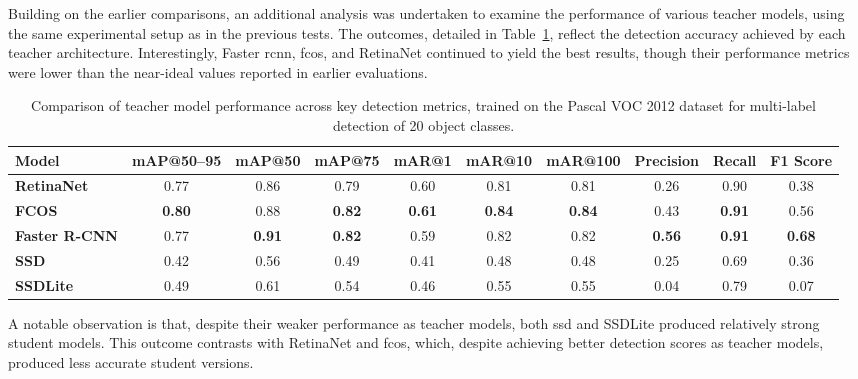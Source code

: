 Building on the earlier comparisons, an additional analysis was undertaken to examine the performance of various teacher models, using the same experimental setup as in the previous tests. The outcomes, detailed in Table~\ref{tab:teacher_model_metrics_pascal_voc}, reflect the detection accuracy achieved by each teacher architecture. Interestingly, Faster \gls{rcnn}, \gls{fcos}, and RetinaNet continued to yield the best results, though their performance metrics were lower than the near-ideal values reported in earlier evaluations.

\begin{table}[!htbp]
    \centering
    \begin{adjustbox}{max width=\textwidth}
    \renewcommand{\arraystretch}{1.5}
    \begin{tabular}{|l|c|c|c|c|c|c|c|c|c|}
        \hline
        \textbf{Model} & \textbf{mAP@50--95} & \textbf{mAP@50} & \textbf{mAP@75} & \textbf{mAR@1} & \textbf{mAR@10} & \textbf{mAR@100} & \textbf{Precision} & \textbf{Recall} & \textbf{F1 Score} \\ \hline \hline
        \textbf{RetinaNet} & 0.77 & 0.86 & 0.79 & 0.60 & 0.81 & 0.81 & 0.26 & 0.90 & 0.38 \\\hline
        \textbf{FCOS} & \textbf{0.80} & 0.88 & \textbf{0.82} & \textbf{0.61} & \textbf{0.84} & \textbf{0.84} & 0.43 & \textbf{0.91} & 0.56 \\\hline
        \textbf{Faster R-CNN} & 0.77 & \textbf{0.91} & \textbf{0.82} & 0.59 & 0.82 & 0.82 & \textbf{0.56} & \textbf{0.91} & \textbf{0.68} \\\hline
        \textbf{SSD} & 0.42 & 0.56 & 0.49 & 0.41 & 0.48 & 0.48 & 0.25 & 0.69 & 0.36 \\\hline
        \textbf{SSDLite} & 0.49 & 0.61 & 0.54 & 0.46 & 0.55 & 0.55 & 0.04 & 0.79 & 0.07 \\
        \hline
    \end{tabular}
    \renewcommand{\arraystretch}{1}
    \end{adjustbox}
    \caption{Comparison of teacher model performance across key detection metrics, trained on the Pascal VOC 2012 dataset for multi-label detection of 20 object classes.}
    \label{tab:teacher_model_metrics_pascal_voc}
\end{table}

A notable observation is that, despite their weaker performance as teacher models, both \gls{ssd} and SSDLite produced relatively strong student models. This outcome contrasts with RetinaNet and \gls{fcos}, which, despite achieving better detection scores as teacher models, produced less accurate student versions.

